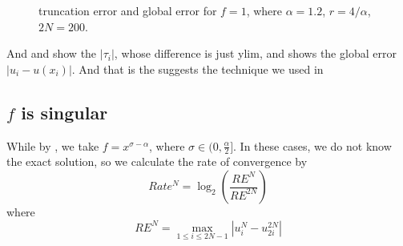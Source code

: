 \documentclass{amsart}
\theoremstyle{definition}
\theoremstyle{remark}
\numberwithin{equation}{section}
\begin{document}
\begin{figure}[htbp]
  \label{fig:errors-f=1}
  \centering
  \caption{truncation error and global error for \(f=1\), where \(\alpha=1.2\), \(r=4/\alpha\), \(2N=200\).}
\end{figure}

And  and  show the \(|\tau_i|\), whose difference is just ylim, and  shows the global error \(|u_i - u(x_i)|\).
And that is the  suggests the technique we used in 

\subsection{$f$ is singular}

While by , we take \(f=x^{\sigma-\alpha}\), where \(\sigma\in(0, \frac{\alpha}{2}]\).
In these cases, we do not know the exact solution, so we calculate the rate of convergence by
\begin{equation*}
  Rate^N = \log_2 \left( \frac{RE^N}{RE^{2N}} \right)
\end{equation*}
where
\begin{equation*}
  RE^N = \max_{1\le i\le 2N-1} |u^N_i - u^{2N}_{2i}|
\end{equation*}
\end{document}
